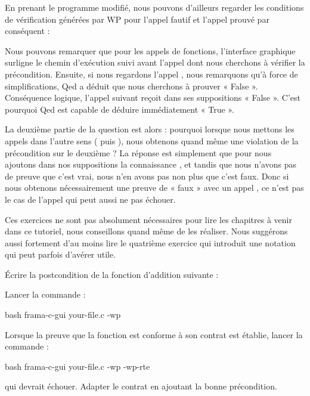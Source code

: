En prenant le programme modifié, nous pouvons d'ailleurs regarder les conditions
de vérification générées par WP pour l'appel fautif et l'appel prouvé par
conséquent :







Nous pouvons remarquer que pour les appels de fonctions, l'interface graphique
surligne le chemin d'exécution suivi avant l'appel dont nous cherchons à
vérifier la précondition. Ensuite, si nous regardons l'appel ,
nous remarquons qu'à force de simplifications, Qed a déduit que nous
cherchons à prouver « False ». Conséquence logique, l'appel suivant 
reçoit dans ses suppositions « False ». C'est pourquoi Qed est capable de déduire
immédiatement « True ».



La deuxième partie de la question est alors : pourquoi lorsque nous mettons les
appels dans l'autre sens ( puis ), nous obtenons
quand même une violation de la précondition sur le deuxième ? La réponse est
simplement que pour  nous ajoutons dans nos suppositions la
connaissance , et tandis que nous n'avons pas de preuve
que c'est vrai, nous n'en avons pas non plus que c'est faux. Donc si nous obtenons
nécessairement une preuve de « faux » avec un appel , ce n'est
pas le cas de l'appel  qui peut aussi ne pas échouer.




Ces exercices ne sont pas absolument nécessaires pour lire les chapitres à
venir dans ce tutoriel, nous conseillons quand même de les réaliser. Nous
suggérons aussi fortement d'au moins lire le quatrième exercice qui introduit
une notation qui peut parfois d'avérer utile.




Écrire la postcondition de la fonction d'addition suivante :




Lancer la commande :

\begin{CodeBlock}{bash}
frama-c-gui your-file.c -wp
\end{CodeBlock}


Lorsque la preuve que la fonction est conforme à son contrat est établie, lancer
la commande :
\begin{CodeBlock}{bash}
frama-c-gui your-file.c -wp -wp-rte
\end{CodeBlock}
qui devrait échouer. Adapter le contrat en ajoutant la bonne précondition.


